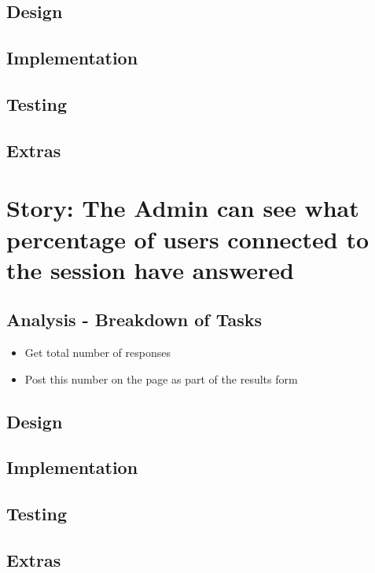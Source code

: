 \documentclass{article}
\begin{document}
\subsection{Design}
\subsection{Implementation}
\subsection{Testing}
\subsection{Extras}
\newpage

\section{Story: The Admin can see what percentage of users connected to the session have answered}
\subsection{Analysis - Breakdown of Tasks}
\begin{itemize}
	\item Get total number of responses
	\item Post this number on the page as part of the results form
\end{itemize}
\subsection{Design}
\subsection{Implementation}
\subsection{Testing}
\subsection{Extras}
\newpage

%
%
\end{document}
